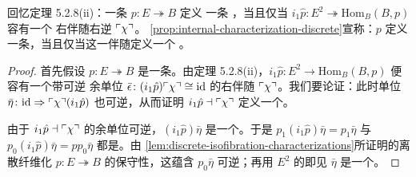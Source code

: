 回忆定理 5.2.8(ii)：一条\trIsofibration{} $p\colon E\twoheadrightarrow B$ 定义%
一条%
\trCartesianFibration，当且仅当
$i_{1}\hat{p}\colon E^{2}\twoheadrightarrow\mathrm{Hom}_{B}(B,p)$ 容有一个%
右伴随右逆 $\ulcorner\chi\urcorner$。
\cref{prop:internal-characterization-discrete}宣称：$p$ 定义一条\trDiscreteCartesianFibration，当且仅当这一伴随定义一个%
\trAdjointEquivalence。

\begin{proof}
首先假设 $p\colon E\twoheadrightarrow B$ 是一条\trDiscreteCartesianFibration。由定理
5.2.8(ii)，$i_{1}\hat{p}\colon E^{2}\to\mathrm{Hom}_{B}(B,p)$ 便容有一个带可逆%
余单位 $\bar{\epsilon}\colon(i_{1}\hat{p})\ulcorner\chi\urcorner\cong\mathrm{id}$ 的右伴随
$\ulcorner\chi\urcorner$。我们要论证：此时单位 $\bar{\eta}\colon\mathrm{id}\Rightarrow\ulcorner\chi\urcorner(i_{1}\hat{p})$ 也可逆，从而证明 $i_{1}\hat{p}\dashv\ulcorner\chi\urcorner$
定义一个\trAdjointEquivalence。

由于 $i_{1}\hat{p}\dashv\ulcorner\chi\urcorner$ 的余单位可逆，$(i_{1}\hat{p})\bar{\eta}$
是一个\trIsomorphism。于是 $p_{1}(i_{1}\hat{p})\bar{\eta}=p_{1}\bar{\eta}$ 与
$p_{0}(i_{1}\hat{p})\bar{\eta}=pp_{0}\bar{\eta}$ 都是\trIsomorphism。由%
\cref{lem:discrete-isofibration-characterizations}所证明的离散纤维化
$p\colon E\twoheadrightarrow B$ 的保守性，这蕴含 $p_{0}\bar{\eta}$ 可逆；再用
$E^{2}$ 的\trTwoCellConservativity{}即见 $\bar{\eta}$ 是一个\trIsomorphism。


\end{proof}
